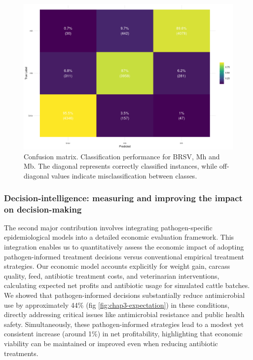 \begin{figure}[H]
  \includegraphics[width=\linewidth]{figures/chap3/chap3-confusionmatrix.png}
  \caption{Confusion matrix. Classification performance for BRSV, Mh and Mb. The diagonal represents correctly classified instances, while off-diagonal values indicate misclassification between classes.}
  \label{fig:chap3-confusion-matrix}
\end{figure}


\subsubsection*{Decision-intelligence: measuring and improving the impact on decision-making}

The second major contribution involves integrating pathogen-specific epidemiological models into a detailed economic evaluation framework. This integration enables us to quantitatively assess the economic impact of adopting pathogen-informed treatment decisions versus conventional empirical treatment strategies. Our economic model accounts explicitly for weight gain, carcass quality, feed, antibiotic treatment costs, and veterinarian interventions, calculating expected net profits and antibiotic usage for simulated cattle batches. We showed that pathogen-informed decisions substantially reduce antimicrobial use by approximately 44\% (fig \ref{fig:chap3-expectation}) in these conditions, directly addressing critical issues like antimicrobial resistance and public health safety. Simultaneously, these pathogen-informed strategies lead to a modest yet consistent increase (around 1\%) in net profitability, highlighting that economic viability can be maintained or improved even when reducing antibiotic treatments.

